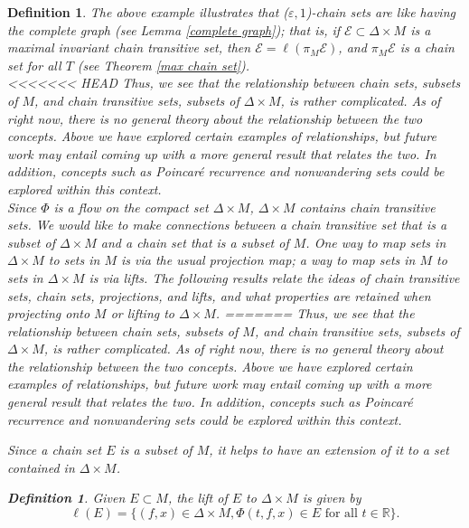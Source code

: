 \documentclass[11pt]{article}
\newtheorem{defn}[thm]{Definition}
\begin{document}
\begin{defn}
The above example illustrates that ($\varepsilon,1$)-chain sets are like having the complete graph (see Lemma \ref{complete graph}); that is, if $\mathcal{E}\subset \Delta\times M$ is a maximal invariant chain transitive set, then $\mathcal{E}=\ell(\pi_M\mathcal{E})$, and $\pi_M\mathcal{E}$ is a chain set for all $T$ (see Theorem \ref{max chain set}).\\
<<<<<<< HEAD
\indent Thus, we see that the relationship between chain sets, subsets of $M$, and chain transitive sets, subsets of $\Delta\times M$, is rather complicated. As of right now, there is no general theory about the relationship between the two concepts.  Above we have explored certain examples of relationships, but future work may entail coming up with a more general result that relates the two.  In addition, concepts such as Poincar\'e recurrence and nonwandering sets could be explored within this context.  \\

Since $\Phi$ is a flow on the compact set $\Delta\times M$, $\Delta\times M$ contains chain transitive sets.  We would like to make connections between a chain transitive set that is a subset of $\Delta\times M$ and a chain set that is a subset of $M$.  One way to map sets in $\Delta\times M$ to sets in $M$ is via the usual projection map; a way to map sets in $M$ to sets in $\Delta\times M$ is via lifts.  The following results relate the ideas of chain transitive sets, chain sets, projections, and lifts, and what properties are retained when projecting onto $M$ or lifting to $\Delta\times M$. 
=======
\indent Thus, we see that the relationship between chain sets, subsets of $M$, and chain transitive sets, subsets of $\Delta\times M$, is rather complicated. As of right now, there is no general theory about the relationship between the two concepts.  Above we have explored certain examples of relationships, but future work may entail coming up with a more general result that relates the two.  In addition, concepts such as Poincar\'e recurrence and nonwandering sets could be explored within this context.  

\indent Since a chain set $E$ is a subset of $M$, it helps to have an extension of it to a set contained in $\Delta\times M$. 

\begin{defn}
Given $E\subset M$, the lift of $E$ to $\Delta\times M$ is given by
$$\ell(E)=\{(f,x)\in \Delta\times M,\Phi(t,f,x)\in E \text{ for all }t\in\mathbb{R}\}.$$
\end{defn}


\end{defn}
\end{document}
